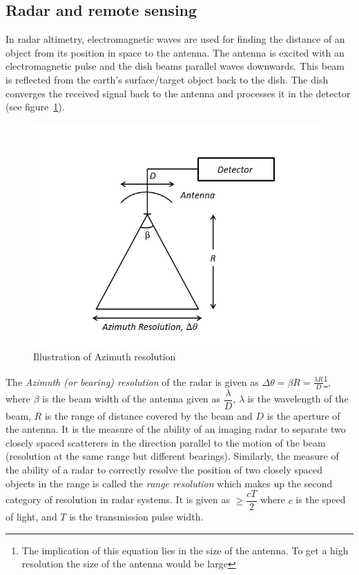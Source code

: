 \subsection{Radar and remote sensing}
In radar altimetry, electromagnetic waves are used for finding the distance of an object from its position in space to the antenna. The antenna is excited with an electromagnetic pulse and the dish beams parallel waves downwards. This beam is reflected from the earth's surface/target object back to the dish. The dish converges the received signal back to the antenna and processes it in the detector (see figure~\ref{fig:new}).
\begin{figure}[h]
\centering
\includegraphics[width=1\linewidth]{./graphics/Azimuth_resolution}
\caption{Illustration of Azimuth resolution}
\label{fig:new}
\end{figure}

The \textit{Azimuth (or bearing) resolution} of the radar is given as $\Delta \theta = \beta R = \frac{\lambda R}{D}$\footnote{The implication of this equation lies in the size of the antenna. To get a high resolution the size of the antenna would be large}, where $\beta$ is the beam width of the antenna given as $\dfrac{\lambda}{D}$, $\lambda$ is the wavelength of the beam, $R$ is the range of distance covered by the beam and $D$ is the aperture of the antenna. It is the measure of the ability of an imaging radar to separate two closely spaced scatterers in the direction parallel to the motion of the beam (resolution at the same range but different bearings). Similarly, the measure of the ability of a radar to correctly resolve the position of two closely spaced objects in the range is called the \textit{range resolution} which makes up the second category of resolution in radar systems. It is given as $\geq \dfrac{cT}{2}$ where $c$ is the speed of light, and $T$ is the transmission pulse width.

